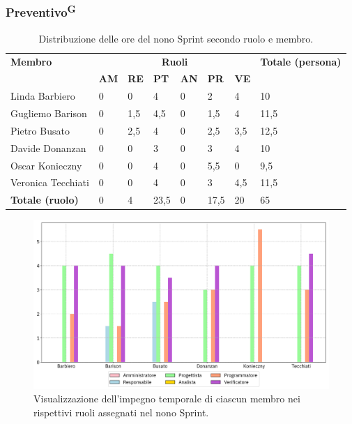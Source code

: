 \documentclass[8pt]{article}
\newcommand{\glossterm}[1]{#1\textsuperscript{G}} %
\begin{document}
\subsubsection{\glossterm{Preventivo}}
\begin{table}[ht!]
	\centering
	\begin{tabular}{p{4cm} p{1cm} p{1cm} p{1cm} p{1cm} p{1cm} p{1cm} p{3cm}}
		\toprule
        \textbf{Membro} & \multicolumn{6}{c}{\textbf{Ruoli}} & \textbf{Totale (persona)}\\
		& \textbf{AM} & \textbf{RE} & \textbf{PT} & \textbf{AN} & \textbf{PR} & \textbf{VE}\\
		\midrule
        Linda Barbiero & 0 & 0 & 4 & 0 & 2 & 4 & 10 \\ 
        Gugliemo Barison & 0 & 1,5 & 4,5 & 0 & 1,5 & 4 & 11,5 \\ 
        Pietro Busato & 0 & 2,5 & 4 & 0 & 2,5 & 3,5 & 12,5 \\ 
        Davide Donanzan & 0 & 0 & 3 & 0 & 3 & 4 & 10 \\ 
        Oscar Konieczny & 0 & 0 & 4 & 0 & 5,5 & 0 & 9,5 \\ 
        Veronica Tecchiati & 0 & 0 & 4 & 0 & 3 & 4,5 & 11,5 \\
        \midrule
        \textbf{Totale (ruolo)} & 0 & 4 & 23,5 & 0 & 17,5 & 20 & 65 \\ 
	\bottomrule
	\end{tabular}
	\caption{Distribuzione delle ore del nono Sprint secondo ruolo e membro.}
	\label{table:Distribuzione delle ore del nono Sprint secondo ruolo e membro}
\end{table}
\begin{figure}[ht!]
    \centering
    \includegraphics[width=15cm]{./images_pdp/istogramma_periodo_9.png}
    \caption{Visualizzazione dell'impegno temporale di ciascun membro nei rispettivi ruoli assegnati
    nel nono Sprint.}
    \label{figure:Visualizzazione dell'impegno temporale di ciascun membro nei rispettivi ruoli
    assegnati nel nono Sprint}
\end{figure}
\end{document}
